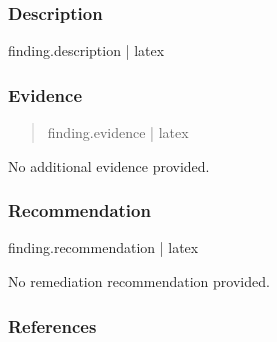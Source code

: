 \documentclass[11pt,a4paper]{article}
\begin{document}
{{{{{\begin{itemize}[leftmargin=*]
{{{{    {%

\end{itemize}



\subsubsection*{Description}

{{ finding.description | latex }}



\subsubsection*{Evidence}

{%

\begin{quote}

{{ finding.evidence | latex }}

\end{quote}

{%

No additional evidence provided.

{%



\subsubsection*{Recommendation}

{%

{{ finding.recommendation | latex }}

{%

No remediation recommendation provided.

{%



{%

\subsubsection*{References}

}}}}}}}}}}}}
\end{document}
